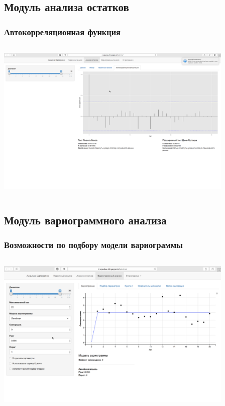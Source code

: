 \documentclass[10pt, ucs, pdf,aspectratio=169]{beamer}
\begin{document}
\subsection{Модуль анализа остатков}

\begin{frame}
  \frametitle{Автокорреляционная функция}   %
   \begin{columns}[c]
   \column{4.5in}
  \includegraphics[width=4.5in]{../../figures/static/3_acf.png}
  \end{columns}
\end{frame}

\subsection{Модуль вариограммного анализа}

\begin{frame}
  \frametitle{Возможности по подбору модели вариограммы}   %
   \begin{columns}[c]
   \column{4.5in}
  \includegraphics[width=4.5in]{../../figures/static/4_variogram.png}
  \end{columns}
\end{frame}
\end{document}
